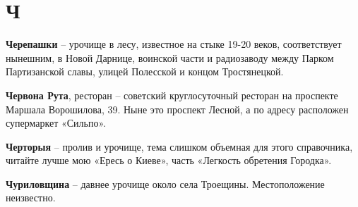 \chapter*{Ч}

\textbf{Черепашки} – урочище в лесу, известное на стыке 19-20 веков, соответствует нынешним, в Новой Дарнице, воинской части и радиозаводу между Парком Партизанской славы, улицей Полесской и концом Тростянецкой.\\

\medskip

\textbf{Червона Рута}, ресторан – советский круглосуточный ресторан на проспекте Маршала Ворошилова, 39. Ныне это проспект Лесной, а по адресу расположен супермаркет «Сильпо».\\

\medskip

\textbf{Черторыя} – пролив и урочище, тема слишком объемная для этого справочника, читайте лучше мою «Ересь о Киеве», часть «Легкость обретения Городка».\\

\medskip

\textbf{Чуриловщина} – давнее урочище около села Троещины. Местоположение неизвестно.\\